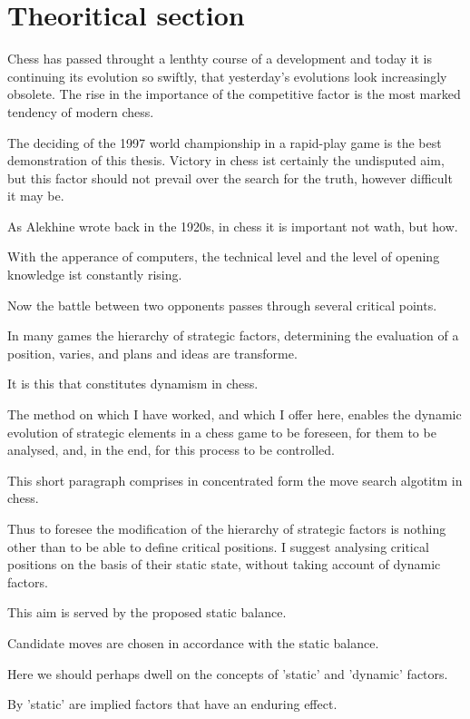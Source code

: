 \documentclass[10pt]{article}
\begin{document}

\section{Theoritical section}
Chess has passed throught a lenthty course of a development and today it is
continuing its evolution so swiftly, that yesterday's evolutions look
increasingly obsolete. The rise in the importance of the competitive factor
is the most marked tendency of modern chess.

The deciding of the 1997 world championship in a rapid-play game is the best
demonstration of this thesis. Victory in chess ist certainly the undisputed
aim, but this factor should not prevail over the search for the truth,
however difficult it may be.

As Alekhine wrote back in the 1920s, in chess it is important not wath, but
how.

With the apperance of computers, the technical level and the level of 
opening knowledge ist constantly rising.

Now the battle between two opponents passes through several critical points.

In many games the hierarchy of strategic factors, determining the evaluation
of a position, varies, and plans and ideas are transforme.

It is this that constitutes dynamism in chess.

The method on which I have worked, and which I offer here, enables the
dynamic evolution of strategic elements in a chess game to be foreseen, for
them to be analysed, and, in the end, for this process to be controlled.

This short paragraph comprises in concentrated form the move search algotitm
in chess.

Thus to foresee the modification of the hierarchy of strategic factors is
nothing other than to be able to define critical positions. I suggest
analysing critical positions on the basis of their static state, without
taking account of dynamic factors.

This aim is served by the proposed static balance.

Candidate moves are chosen in accordance with the static balance.

Here we should perhaps dwell on the concepts of 'static' and 'dynamic'
factors.

By 'static' are implied factors that have an enduring effect.
\end{document}
